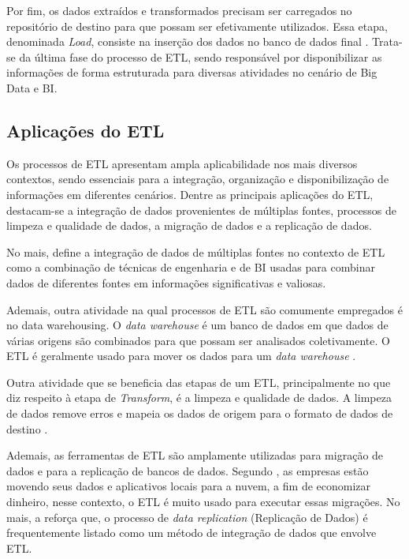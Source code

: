 Por fim, os dados extraídos e transformados precisam ser carregados no repositório de 
destino para que possam ser efetivamente utilizados. Essa etapa, denominada \textit{Load}, 
consiste na inserção dos dados no banco de dados final \cite{singh2022etl}. Trata-se da 
última fase do processo de ETL, sendo responsável por disponibilizar as informações 
de forma estruturada para diversas atividades no cenário de Big Data e BI.

\subsection{Aplicações do ETL}

Os processos de ETL apresentam ampla aplicabilidade nos mais diversos contextos, 
sendo essenciais para a integração, organização e disponibilização de informações em 
diferentes cenários. Dentre as principais aplicações do ETL, destacam-se a integração 
de dados provenientes de múltiplas fontes, processos de limpeza e qualidade de dados, 
a migração de dados e a replicação de dados.

No mais,  define a integração de dados de múltiplas fontes no contexto de 
ETL como a combinação de técnicas de engenharia e de BI usadas para combinar dados de 
diferentes fontes em informações significativas e valiosas.

Ademais, outra atividade na qual processos de ETL são comumente empregados é no data 
warehousing. O \textit{data warehouse} é um banco de dados em que dados de várias origens são 
combinados para que possam ser analisados coletivamente. O ETL é geralmente usado para 
mover os dados para um \textit{data warehouse} \cite{googlecloudetl}.

Outra atividade que se beneficia das etapas de um ETL, principalmente no que diz respeito
à etapa de \textit{Transform}, é a limpeza e qualidade de dados. A limpeza de dados remove erros 
e mapeia os dados de origem para o formato de dados de destino
\cite{aws2026etl}.

Ademais, as ferramentas de ETL são amplamente utilizadas para migração de dados e 
para a replicação de bancos de dados. Segundo , as 
empresas estão movendo seus dados e aplicativos locais para a nuvem, a fim de 
economizar dinheiro, nesse contexto, o ETL é muito usado para executar essas 
migrações. No mais, a  reforça que, o processo de \textit{data replication} 
(Replicação de Dados) é frequentemente listado como um método de integração de dados que envolve ETL.

